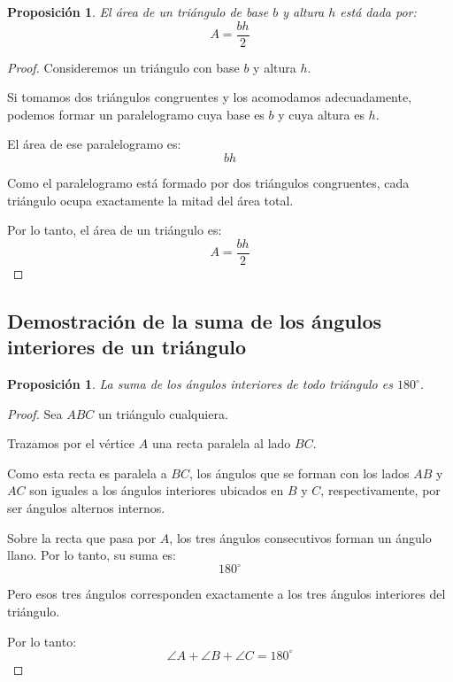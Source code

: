 \documentclass[12pt,final]{report}
\theoremstyle{plain}
\newtheorem{proposition}[theorem]{Proposición}
\theoremstyle{definition}
\begin{document}
\begin{proposition}
El área de un triángulo de base $b$ y altura $h$ está dada por:
\[
A = \frac{bh}{2}
\]
\end{proposition}

\begin{proof}

Consideremos un triángulo con base $b$ y altura $h$.

Si tomamos dos triángulos congruentes y los acomodamos adecuadamente, podemos formar un paralelogramo cuya base es $b$ y cuya altura es $h$.

El área de ese paralelogramo es:
\[
bh
\]

Como el paralelogramo está formado por dos triángulos congruentes, cada triángulo ocupa exactamente la mitad del área total.

Por lo tanto, el área de un triángulo es:
\[
A = \frac{bh}{2}
\]

\end{proof}

\newpage

\subsection{Demostración de la suma de los ángulos interiores de un triángulo}

\begin{proposition}
La suma de los ángulos interiores de todo triángulo es $180^\circ$.
\end{proposition}

\begin{proof}

Sea $ABC$ un triángulo cualquiera.

Trazamos por el vértice $A$ una recta paralela al lado $BC$.

Como esta recta es paralela a $BC$, los ángulos que se forman con los lados $AB$ y $AC$ son iguales a los ángulos interiores ubicados en $B$ y $C$, respectivamente, por ser ángulos alternos internos.

Sobre la recta que pasa por $A$, los tres ángulos consecutivos forman un ángulo llano. Por lo tanto, su suma es:
\[
180^\circ
\]

Pero esos tres ángulos corresponden exactamente a los tres ángulos interiores del triángulo.

Por lo tanto:
\[
\angle A + \angle B + \angle C = 180^\circ
\]

\end{proof}
\end{document}
